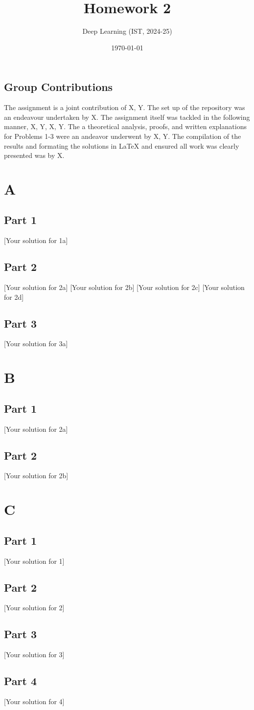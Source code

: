 \documentclass{scientificreport}
\title{Homework 2}
\subtitle{Deep Learning (IST, 2024-25)}
\date{\today}
\begin{document}
\subsection*{Group Contributions}

The assignment is a joint contribution of X, Y. The set up of the repository was an endeavour undertaken by X. The assignment itself was tackled in the following manner, X, Y, X, Y. The a theoretical analysis, proofs, and written explanations for Problems 1-3 were an andeavor underwent by X, Y. The compilation of the results and formating the solutions in \LaTeX{} and ensured all work was clearly presented was by X.

\section{A} %
\subsection{Part 1}
[Your solution for 1a]


\subsection{Part 2}
[Your solution for 2a]
[Your solution for 2b]
[Your solution for 2c]
[Your solution for 2d]

\subsection{Part 3}
[Your solution for 3a]

\section{B} %
\subsection{Part 1}
[Your solution for 2a]

\subsection{Part 2} 
[Your solution for 2b]

\section{C}%
\subsection{Part 1}
[Your solution for 1]
\subsection{Part 2}
[Your solution for 2]
\subsection{Part 3}
[Your solution for 3]
\subsection{Part 4}
[Your solution for 4]
\end{document}
